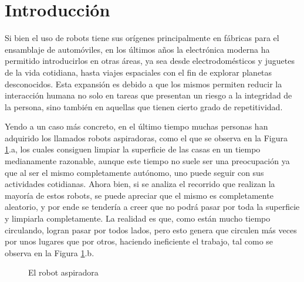 \section{Introducción}
\label{sec:2_marcoteorico}
Si bien el uso de robots tiene sus orígenes principalmente en fábricas para el ensamblaje de automóviles, en los últimos años la electrónica moderna ha permitido introducirlos en otras áreas, ya sea desde electrodomésticos y juguetes de la vida cotidiana, hasta viajes espaciales con el fin de explorar planetas desconocidos. Esta expansión es debido a que los mismos permiten reducir la interacción humana no solo en tareas que presentan un riesgo a la integridad de la persona, sino también en aquellas que tienen cierto grado de repetitividad.

Yendo a un caso más concreto, en el último tiempo muchas personas han adquirido los llamados robots aspiradoras, como el que se observa en la Figura \ref{fig:vaccumrobot}.a, los cuales consiguen limpiar la superficie de las casas en un tiempo medianamente razonable, aunque este tiempo no suele ser una preocupación ya que al ser el mismo completamente autónomo, uno puede seguir con sus actividades cotidianas. Ahora bien, si se analiza el recorrido que realizan la mayoría de estos robots, se puede apreciar que el mismo es completamente aleatorio, y por ende se tendería a creer que no podrá pasar por toda la superficie y limpiarla completamente. La realidad es que, como están mucho tiempo circulando, logran pasar por todos lados, pero esto genera que circulen más veces por unos lugares que por otros, haciendo ineficiente el trabajo, tal como se observa en la Figura \ref{fig:vaccumrobot}.b.

\begin{figure}[!ht]
    \centering
    \qquad
    \caption{El robot aspiradora}
    \label{fig:vaccumrobot}
\end{figure}

